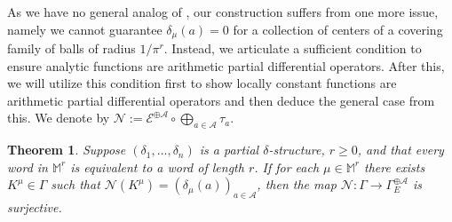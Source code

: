 \documentclass[10pt]{amsart}
\theoremstyle{Theorem}
\newtheorem{thm}{Theorem}[section]
\theoremstyle{definition}
\newcommand{\cA}{\mathcal{A}}
\newcommand{\cE}{\mathcal{E}}
\renewcommand{\d}{\delta}
\def\cN{\mathcal{N}}
\begin{document}
As we have no general analog of \cite[Lem. 11]{BRS11}, our construction suffers from one more issue, namely we cannot guarantee $\d_\mu(a) = 0$ for a collection of centers of a covering family of balls of radius $1/\pi^r$. Instead, we articulate a sufficient condition to ensure analytic functions are arithmetic partial differential operators. After this, we will utilize this condition first to show locally constant functions are  arithmetic partial differential operators and then deduce the general case from this. We denote by $\cN := \cE^{\oplus \cA} \circ \bigoplus_{a \in \cA} \tau_a$.


\begin{thm} \label{thm:gutsofproof} Suppose $(\delta_1,\ldots, \delta_n)$ is a partial $\delta$-structure, $r\geq 0$, and that every word in $\mathbb M^r$ is equivalent to a word of length $r$.  If for each $\mu\in \mathbb M^r$ there exists $K^\mu\in \Gamma$ such that $\cN(K^\mu) = (\delta_\mu(a))_{a\in \cA}$, then the map $\cN: \Gamma \to \Gamma_E^{\oplus \cA}$ is surjective.
\end{thm}
\end{document}
